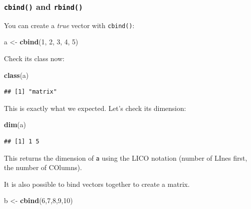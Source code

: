 \documentclass[]{gitbook}
\newenvironment{Shaded}{\begin{snugshade}}{\end{snugshade}}
\newcommand{\DecValTok}[1]{\textcolor[rgb]{0.00,0.00,0.81}{#1}}
\newcommand{\KeywordTok}[1]{\textcolor[rgb]{0.13,0.29,0.53}{\textbf{#1}}}
\newcommand{\NormalTok}[1]{#1}
\newcommand{\StringTok}[1]{\textcolor[rgb]{0.31,0.60,0.02}{#1}}
\begin{document}
\hypertarget{cbind-and-rbind}{%
\subsubsection{\texorpdfstring{\texttt{cbind()} and \texttt{rbind()}}{cbind() and rbind()}}\label{cbind-and-rbind}}

You can create a \emph{true} vector with \texttt{cbind()}:

\begin{Shaded}
\begin{Highlighting}[]
\NormalTok{a <-}\StringTok{ }\KeywordTok{cbind}\NormalTok{(}\DecValTok{1}\NormalTok{, }\DecValTok{2}\NormalTok{, }\DecValTok{3}\NormalTok{, }\DecValTok{4}\NormalTok{, }\DecValTok{5}\NormalTok{)}
\end{Highlighting}
\end{Shaded}

Check its class now:

\begin{Shaded}
\begin{Highlighting}[]
\KeywordTok{class}\NormalTok{(a)}
\end{Highlighting}
\end{Shaded}

\begin{verbatim}
## [1] "matrix"
\end{verbatim}

This is exactly what we expected. Let's check its dimension:

\begin{Shaded}
\begin{Highlighting}[]
\KeywordTok{dim}\NormalTok{(a)}
\end{Highlighting}
\end{Shaded}

\begin{verbatim}
## [1] 1 5
\end{verbatim}

This returns the dimension of \texttt{a} using the LICO notation (number of LInes first, the number of COlumns).

It is also possible to bind vectors together to create a matrix.

\begin{Shaded}
\begin{Highlighting}[]
\NormalTok{b <-}\StringTok{ }\KeywordTok{cbind}\NormalTok{(}\DecValTok{6}\NormalTok{,}\DecValTok{7}\NormalTok{,}\DecValTok{8}\NormalTok{,}\DecValTok{9}\NormalTok{,}\DecValTok{10}\NormalTok{)}
\end{Highlighting}
\end{Shaded}
\end{document}
